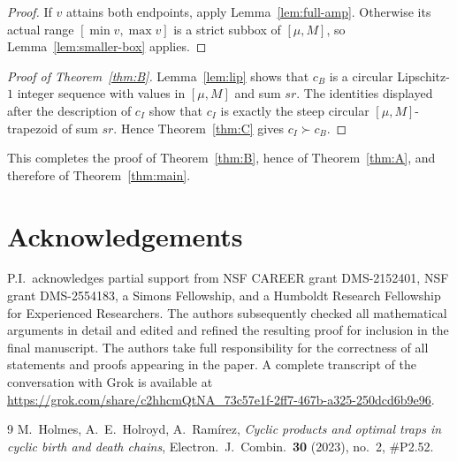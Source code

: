 \documentclass[11pt]{article}
\theoremstyle{definition}
\begin{document}
\begin{proof}
If $v$ attains both endpoints, apply Lemma~\ref{lem:full-amp}. Otherwise its actual range $[\min v,\max v]$ is a strict subbox of $[\mu,M]$, so Lemma~\ref{lem:smaller-box} applies.
\end{proof}

\begin{proof}[Proof of Theorem~\ref{thm:B}]
Lemma~\ref{lem:lip} shows that $c_B$ is a circular Lipschitz-$1$ integer sequence with values in $[\mu,M]$ and sum $sr$. The identities displayed after the description of $c_I$ show that $c_I$ is exactly the steep circular $[\mu,M]$-trapezoid of sum $sr$. Hence Theorem~\ref{thm:C} gives $c_I\succ c_B$.
\end{proof}

This completes the proof of Theorem~\ref{thm:B}, hence of Theorem~\ref{thm:A}, and therefore of Theorem~\ref{thm:main}.

\section*{Acknowledgements}

P.I.\ acknowledges partial support from NSF CAREER grant DMS-2152401,
NSF grant DMS-2554183, a Simons Fellowship, and a Humboldt Research Fellowship
for Experienced Researchers.
 The authors subsequently checked all mathematical arguments in detail and edited and refined the resulting proof for inclusion in the final manuscript. The authors take full responsibility for the correctness of all statements and proofs appearing in the paper. A complete transcript of the conversation with Grok is available at \url{https://grok.com/share/c2hhcmQtNA_73c57e1f-2ff7-467b-a325-250dcd6b9e96}.

\begin{thebibliography}{9}
M.~Holmes, A.~E.~Holroyd, A.~Ram\'irez,
\textit{Cyclic products and optimal traps in cyclic birth and death chains},
Electron.\ J.\ Combin.\ \textbf{30} (2023), no.~2, \#P2.52.
\end{thebibliography}
\end{document}
